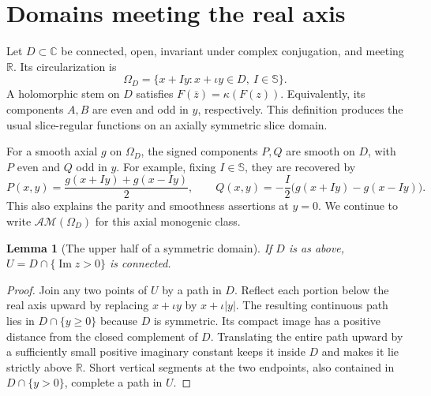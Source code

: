 \documentclass[11pt,a4paper]{article}
\numberwithin{equation}{section}
\newtheorem{lemma}[theorem]{Lemma}
\theoremstyle{definition}
\theoremstyle{remark}
\newcommand{\R}{\mathbb R}
\newcommand{\C}{\mathbb C}
\newcommand{\SSS}{\mathbb S}
\newcommand{\AM}{\mathcal{AM}}
\begin{document}
\section{Domains meeting the real axis}
\label{sec:realaxis}
Let $D\subset\C$ be connected, open, invariant under complex conjugation,
and meeting $\R$. Its circularization is
\[
 \Omega_D=\{x+Iy:x+\iota y\in D,\ I\in\SSS\}.
\]
A holomorphic stem on $D$ satisfies
$F(\bar z)=\kappa(F(z))$. Equivalently, its components $A,B$ are even
and odd in $y$, respectively. This definition produces the usual
slice-regular functions on an axially symmetric slice domain.

For a smooth axial $g$ on $\Omega_D$, the signed components $P,Q$ are
smooth on $D$, with $P$ even and $Q$ odd in $y$. For example, fixing
$I\in\SSS$, they are recovered by
\[
 P(x,y)=\frac{g(x+Iy)+g(x-Iy)}2,\qquad
 Q(x,y)=-\frac I2\bigl(g(x+Iy)-g(x-Iy)\bigr).
\]
This also explains the parity and smoothness assertions at $y=0$.
We continue to write $\AM(\Omega_D)$ for this axial monogenic class.

\begin{lemma}[The upper half of a symmetric domain]\label{lem:upper}
If $D$ is as above, $U=D\cap\{\operatorname{Im}z>0\}$ is connected.
\end{lemma}
\begin{proof}
Join any two points of $U$ by a path in $D$. Reflect each portion below
the real axis upward by replacing $x+\iota y$ by $x+\iota|y|$.
The resulting continuous path lies in $D\cap\{y\ge0\}$ because $D$
is symmetric. Its compact image has a positive distance from the closed
complement of $D$. Translating the entire path upward by a sufficiently
small positive imaginary constant keeps it inside $D$ and makes it lie
strictly above $\R$. Short vertical segments at the two endpoints, also
contained in $D\cap\{y>0\}$, complete a path in $U$.
\end{proof}
\end{document}

